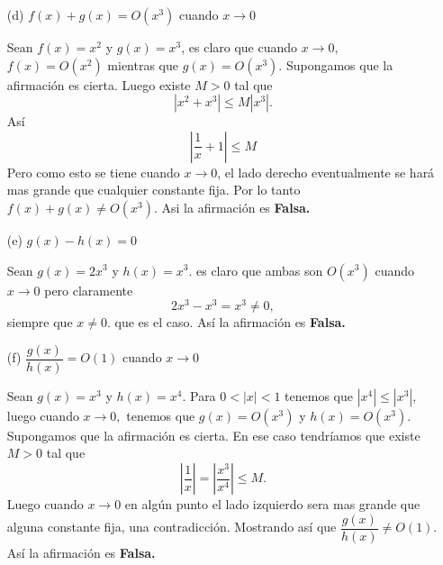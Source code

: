 \documentclass[12pt, a4paper]{article}%
\begin{document}
\begin{itemize}
\begin{solution}
    \end{solution}
    \item[(d)] \( f(x) + g(x) = O(x^3) \) cuando \( x \to 0 \)
    \begin{solution}
        Sean $f(x)=x^2$ y $g(x)=x^3$, es claro que cuando $x\to 0,$ $f(x)=O(x^2)$ mientras que $g(x)=O(x^3).$ Supongamos que la afirmación es cierta. Luego existe $M>0$ tal que
        $$|x^2+x^3|\leq M|x^3|.$$
        Así 
        $$\left|\frac{1}{x}+1\right|\leq M$$
        Pero como esto se tiene cuando $x\to 0$, el lado derecho eventualmente se hará mas grande que cualquier constante fija. Por lo tanto $f(x)+g(x)\neq O(x^3).$ Asi la afirmación es \textbf{Falsa.}
    \end{solution}
    \item[(e)] \( g(x) - h(x) = 0 \)
    \begin{solution}
        Sean $g(x)=2x^3$ y $h(x)=x^3.$ es claro que ambas son $O(x^3)$ cuando $x\to 0$ pero claramente
        $$2x^3-x^3=x^3\neq 0,$$
        siempre que $x\neq 0.$ que es el caso. Así la afirmación es \textbf{Falsa.}
    \end{solution}
    \item[(f)] \( \dfrac{g(x)}{h(x)} = O(1) \) cuando \( x \to 0 \)
    \begin{solution}
        Sean $g(x)=x^3$ y $h(x)=x^4.$ Para $0<|x|<1$ tenemos que $|x^4|\leq |x^3|$, luego cuando $x\to 0,$ tenemos que $g(x)=O(x^3)$ y $h(x)=O(x^3).$ Supongamos que la afirmación es cierta. En ese caso tendríamos que existe $M>0$ tal que
        $$\left|\frac{1}{x}\right|=\left|\frac{x^3}{x^4}\right|\leq M.$$
        Luego cuando $x\to 0$ en algún punto el lado izquierdo sera mas grande que alguna constante fija, una contradicción. Mostrando así que $\dfrac{g(x)}{h(x)}\neq O(1).$ Así la afirmación es \textbf{Falsa.}
    \end{solution}
\end{itemize}
\end{document}
